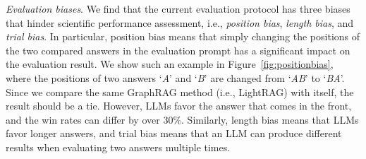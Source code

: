 \item \textit{Evaluation biases}. We find that the current evaluation protocol has three biases that hinder scientific performance assessment, i.e., \textit{position bias}, \textit{length bias}, and \textit{trial bias}. In particular, position bias means that simply changing the positions of the two compared answers in the evaluation prompt has a significant impact on the evaluation result. We show such an example in Figure~\ref{fig:positionbias}, where the positions of two answers `\textit{A}' and `\textit{B}' are changed from `\textit{AB}' to `\textit{BA}'. Since we compare the same GraphRAG method (i.e., LightRAG) with itself, the result should be a tie. However, LLMs favor the answer that comes in the front, and the win rates can differ by over 30\%. Similarly, length bias means that LLMs favor longer answers, and trial bias means that an LLM can produce different results when evaluating two answers multiple times.     

\squishend








